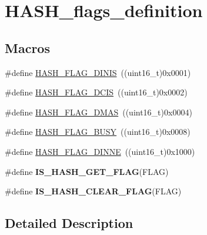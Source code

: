 \hypertarget{group___h_a_s_h__flags__definition}{\section{H\-A\-S\-H\-\_\-flags\-\_\-definition}
\label{group___h_a_s_h__flags__definition}
}
\subsection*{Macros}
\begin{DoxyCompactItemize}
\item 
\#define \hyperlink{group___h_a_s_h__flags__definition_ga0f63115b39daba0d413c79f324923dd7}{H\-A\-S\-H\-\_\-\-F\-L\-A\-G\-\_\-\-D\-I\-N\-I\-S}~((uint16\-\_\-t)0x0001)
\item 
\#define \hyperlink{group___h_a_s_h__flags__definition_ga030c3298c0c54a79e5360e216bc257df}{H\-A\-S\-H\-\_\-\-F\-L\-A\-G\-\_\-\-D\-C\-I\-S}~((uint16\-\_\-t)0x0002)
\item 
\#define \hyperlink{group___h_a_s_h__flags__definition_ga576ba8b2dca0ec25fb6c53a07b285af7}{H\-A\-S\-H\-\_\-\-F\-L\-A\-G\-\_\-\-D\-M\-A\-S}~((uint16\-\_\-t)0x0004)
\item 
\#define \hyperlink{group___h_a_s_h__flags__definition_ga7638e6048806f6ba361f162db23c2a53}{H\-A\-S\-H\-\_\-\-F\-L\-A\-G\-\_\-\-B\-U\-S\-Y}~((uint16\-\_\-t)0x0008)
\item 
\#define \hyperlink{group___h_a_s_h__flags__definition_gadca9225b146f649a24d34cc813fe0c92}{H\-A\-S\-H\-\_\-\-F\-L\-A\-G\-\_\-\-D\-I\-N\-N\-E}~((uint16\-\_\-t)0x1000)
\item 
\#define {\bfseries I\-S\-\_\-\-H\-A\-S\-H\-\_\-\-G\-E\-T\-\_\-\-F\-L\-A\-G}(F\-L\-A\-G)
\item 
\#define {\bfseries I\-S\-\_\-\-H\-A\-S\-H\-\_\-\-C\-L\-E\-A\-R\-\_\-\-F\-L\-A\-G}(F\-L\-A\-G)
\end{DoxyCompactItemize}


\subsection{Detailed Description}


